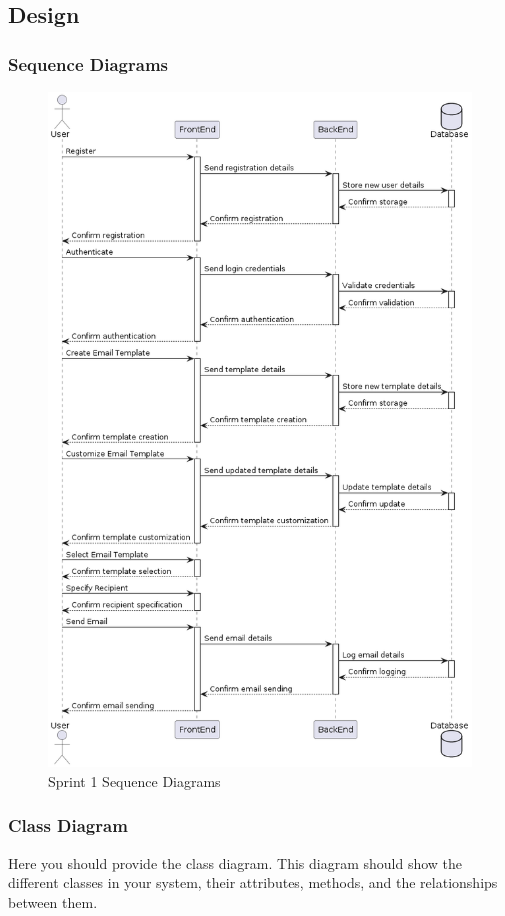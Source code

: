 \subsection{Design}

\newpage

\subsubsection{Sequence Diagrams}

\begin{figure}[ht]
	\centering
	\includegraphics[width=0.75\linewidth]{Images//images/sequence diagram sprint 1.png}
	\caption{Sprint 1 Sequence Diagrams}
	\label{fig:Sprint 1 Sequence Diagrams}
\end{figure}

\subsubsection{Class Diagram}

Here you should provide the class diagram. This diagram should show the different classes in your system, their attributes, methods, and the relationships between them.
